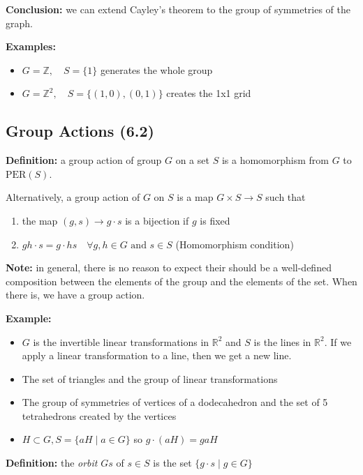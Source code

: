 \documentclass[12pt]{report}
\newcommand{\R}{\mathbb{R}}
\newcommand{\Z}{\mathbb{Z}}
\begin{document}
        \textbf{Conclusion:} we can extend Cayley's theorem to the group of symmetries of the graph. 

        \textbf{Examples:}
        \begin{itemize}
            \item $G = \Z, \quad S = \{1\}$ generates the whole group 
            \item $G =\Z^2, \quad S = \{(1, 0), (0, 1)\}$ creates the 1x1 grid 
        \end{itemize}

    \subsection*{Group Actions (6.2)}
        \textbf{Definition:} a group action of group $G$ on a set $S$ is a homomorphism from $G$ to $\text{PER}(S)$. 

        Alternatively, a group action of $G$ on $S$ is a map $G \times S \to S$ such that 
        \begin{enumerate}
            \item the map $(g, s) \to g\cdot s$ is a bijection if $g$ is fixed
            \item $gh\cdot s = g\cdot hs \quad \forall g,h \in G \text{ and } s\in S$ (Homomorphism condition)

        \end{enumerate}

        \textbf{Note:} in general, there is no reason to expect their should be a well-defined composition between the elements of the group and the elements of the set. When there is, we have a group action.

        \textbf{Example:}
        \begin{itemize}
            \item $G$ is the invertible linear transformations in $\R^2$ and $S$ is the lines in $\R^2$. If we apply a linear transformation to a line, then we get a new line. 
            \item The set of triangles and the group of linear transformations
            \item The group of symmetries of vertices of a dodecahedron and the set of 5 tetrahedrons created by the vertices
            \item $H \subset G, S = \{aH \; | \; a \in G\}$ so $g\cdot (aH) = gaH$
        \end{itemize}

        \textbf{Definition:} the \emph{orbit} $Gs$ of $s\in S$ is the set $\{g\cdot s \; | \; g \in G\}$
\end{document}
